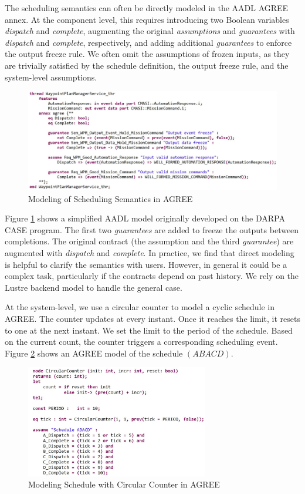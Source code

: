 The scheduling semantics can often be directly modeled in the AADL AGREE annex. At the component level, this requires introducing two Boolean variables \emph{dispatch} and \emph{complete}, augmenting the original \emph{assumptions} and \emph{guarantees} with \emph{dispatch} and \emph{complete}, respectively, and adding additional \emph{guarantees} to enforce the output freeze rule. We often omit the assumptions of frozen inputs, as they are trivially satisfied by the schedule definition, the output freeze rule, and the system-level assumptions.

\begin{figure}[t!]
\centering
\includegraphics[width=130mm]{wpmAGREE3.jpg}
\caption{Modeling of Scheduling Semantics in AGREE\label{wpmAGREE}}
\end{figure}

Figure \ref{wpmAGREE} shows a simplified AADL model originally developed on the DARPA CASE program. The first two \emph{guarantees} are added to freeze the outputs between completions. The original contract (the assumption and the third \emph{guarantee}) are augmented with \emph{dispatch} and \emph{complete}.
In practice, we find that direct modeling is helpful to clarify the semantics with users. However, in general it could be a complex task, particularly if the contracts depend on past history. We rely on the Lustre backend model to handle the general case.

At the system-level, we use a circular counter to model a cyclic schedule in AGREE. 
The counter updates at every instant. Once it reaches the limit, it resets to one at the next instant.
We set the limit to the period of the schedule. 
Based on the current count, the counter triggers a corresponding scheduling event.
Figure \ref{schedule} shows an AGREE model of the schedule $(ABACD)$.

\begin{figure}[t!]
\centering
\includegraphics[width=80mm]{schedule.jpg}
\caption{Modeling Schedule with Circular Counter in AGREE\label{schedule}}
\end{figure}

